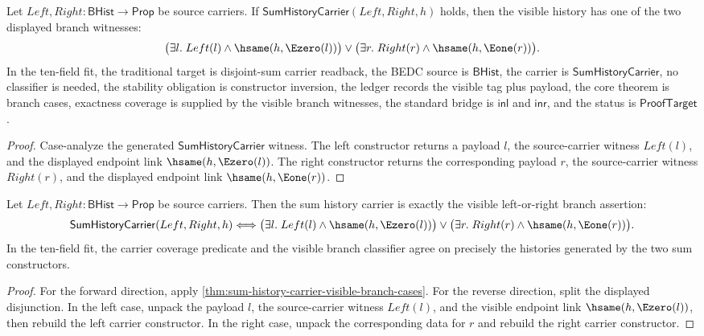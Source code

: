 \begin{theorem}
\label{thm:sum-history-carrier-visible-branch-cases}
Let $Left,Right:\mathsf{BHist}\to\mathsf{Prop}$ be source carriers. If
$\mathsf{SumHistoryCarrier}(Left,Right,h)$ holds, then the visible history has
one of the two displayed branch witnesses:
$$
\bigl(\exists l.\; Left(l)\land \hsame(h,\Ezero(l))\bigr)
\lor
\bigl(\exists r.\; Right(r)\land \hsame(h,\Eone(r))\bigr).
$$
In the ten-field fit, the traditional target is disjoint-sum carrier readback,
the BEDC source is $\mathsf{BHist}$, the carrier is
$\mathsf{SumHistoryCarrier}$, no classifier is needed, the stability obligation
is constructor inversion, the ledger records the visible tag plus payload, the
core theorem is branch cases, exactness coverage is supplied by the visible
branch witnesses, the standard bridge is $\mathsf{inl}$ and $\mathsf{inr}$, and
the status is $\mathsf{ProofTarget}$.
\end{theorem}
\begin{proof}
Case-analyze the generated $\mathsf{SumHistoryCarrier}$ witness. The left
constructor returns a payload $l$, the source-carrier witness $Left(l)$, and
the displayed endpoint link $\hsame(h,\Ezero(l))$. The right constructor
returns the corresponding payload $r$, the source-carrier witness $Right(r)$,
and the displayed endpoint link $\hsame(h,\Eone(r))$.
\end{proof}

\begin{theorem}
\label{thm:sum-history-carrier-visible-branch-exactness}
Let $Left,Right:\mathsf{BHist}\to\mathsf{Prop}$ be source carriers. Then the
sum history carrier is exactly the visible left-or-right branch assertion:
$$
\mathsf{SumHistoryCarrier}(Left,Right,h)
\Longleftrightarrow
\bigl(\exists l.\; Left(l)\land \hsame(h,\Ezero(l))\bigr)
\lor
\bigl(\exists r.\; Right(r)\land \hsame(h,\Eone(r))\bigr).
$$
In the ten-field fit, the carrier coverage predicate and the visible branch
classifier agree on precisely the histories generated by the two sum
constructors.
\end{theorem}
\begin{proof}
For the forward direction, apply
\autoref{thm:sum-history-carrier-visible-branch-cases}. For the reverse
direction, split the displayed disjunction. In the left case, unpack the
payload $l$, the source-carrier witness $Left(l)$, and the visible endpoint
link $\hsame(h,\Ezero(l))$, then rebuild the left carrier constructor. In the
right case, unpack the corresponding data for $r$ and rebuild the right carrier
constructor.
\end{proof}


